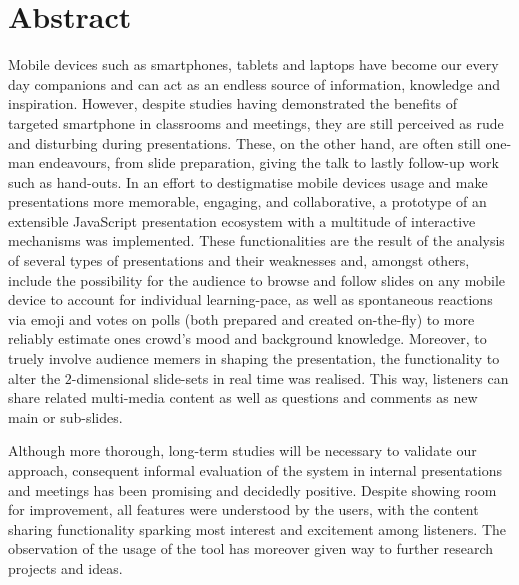 \chapter{Abstract}
Mobile devices such as smartphones, tablets and laptops have become our every day companions and can act as an endless source of information, knowledge and inspiration. However, despite studies having demonstrated the benefits  of targeted smartphone in classrooms and meetings, they are still perceived as rude and disturbing during presentations. These, on the other hand, are often still one-man endeavours, from slide preparation, giving the talk to lastly follow-up work such as hand-outs. In an effort to destigmatise mobile devices usage and make presentations more memorable, engaging, and collaborative, a prototype of an extensible JavaScript presentation eco\-system with a multitude of interactive mechanisms was implemented. These functionalities are the result of the analysis of several types of presentations and their weaknesses and, amongst others, include the possibility for the audience to browse and follow slides on any mobile device to account for individual learning-pace, as well as spontaneous reactions via emoji and votes on polls (both prepared and created on-the-fly) to more reliably estimate ones crowd's mood and background knowledge. Moreover, to truely involve audience memers in shaping the presentation, the functionality to alter the $2$-dimensional slide-sets in real time was realised. This way, listeners can share related multi-media content as well as questions and comments as new main or sub-slides.

Although more thorough, long-term studies will be necessary to validate our approach, consequent informal evaluation of the system in internal presentations and meetings has been promising and decidedly positive. Despite showing room for improvement, all features were understood by the users, with the content sharing functionality sparking most interest and excitement among listeners. The observation of the usage of the tool has moreover given way to further research projects and ideas. 